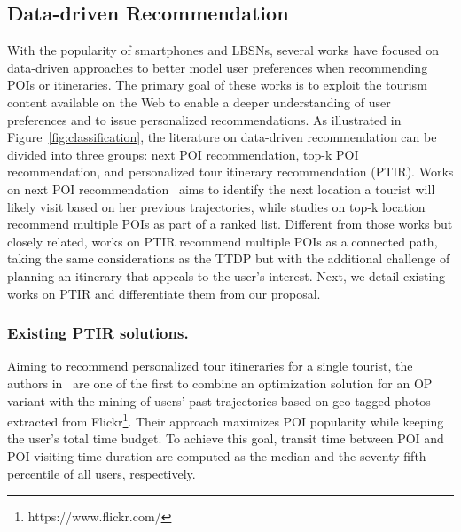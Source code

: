 {\subsection{Data-driven Recommendation} 
With the popularity of smartphones and LBSNs, several works have focused on data-driven approaches to better model user preferences when recommending POIs or itineraries. The primary goal of these works is to exploit the tourism content available on the Web to enable a deeper understanding of user preferences and to issue personalized recommendations. As illustrated in Figure~\ref{fig:classification}, the literature on data-driven recommendation can be divided into three groups: next POI recommendation, top-k POI recommendation, and personalized tour itinerary recommendation (PTIR). Works on next POI recommendation~\cite{chen-comprehensive:17,liao-multi-context:18,fan-deep:18,sassi-location:19} aims to identify the next location a tourist will likely visit based on her previous trajectories, while studies on top-k location~\cite{logesh:19,zhou-adversarial:19,rahmani-joint:20} recommend multiple POIs as part of a ranked list. Different from those works but closely related, works on PTIR recommend multiple POIs as a connected path, taking the same considerations as the TTDP but with the additional challenge of planning an itinerary that appeals to the user's interest. Next, we detail existing works on PTIR and differentiate them from our proposal.}

{\subsubsection{Existing PTIR solutions.}} 
{Aiming to recommend personalized tour itineraries for a single tourist, the authors in~\cite{choudhury-automatic:10} are one of the first to combine an optimization solution for an OP variant with the mining of users' past trajectories based on geo-tagged photos extracted from Flickr\footnote{https://www.flickr.com/}. Their approach maximizes POI popularity while keeping the user's total time budget. To achieve this goal, transit time between POI and POI visiting time duration are computed as the median and the seventy-fifth percentile of all users, respectively.}

